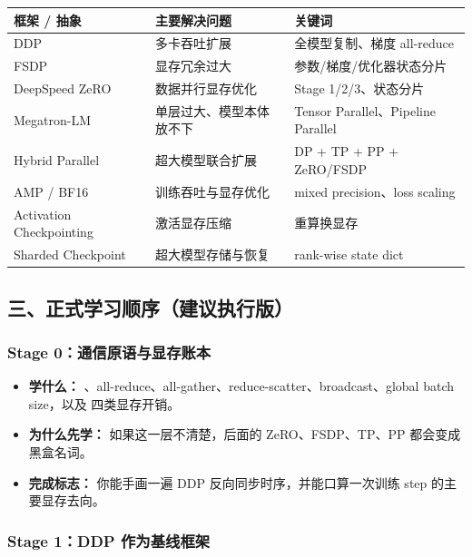 \begin{center}
\begin{tabular}{p{4cm}p{4cm}p{5.5cm}}
\hline
\textbf{框架 / 抽象} & \textbf{主要解决问题} & \textbf{关键词} \\
\hline
DDP & 多卡吞吐扩展 & 全模型复制、梯度 all-reduce \\
FSDP & 显存冗余过大 & 参数/梯度/优化器状态分片 \\
DeepSpeed ZeRO & 数据并行显存优化 & Stage 1/2/3、状态分片 \\
Megatron-LM & 单层过大、模型本体放不下 & Tensor Parallel、Pipeline Parallel \\
Hybrid Parallel & 超大模型联合扩展 & DP + TP + PP + ZeRO/FSDP \\
AMP / BF16 & 训练吞吐与显存优化 & mixed precision、loss scaling \\
Activation Checkpointing & 激活显存压缩 & 重算换显存 \\
Sharded Checkpoint & 超大模型存储与恢复 & rank-wise state dict \\
\hline
\end{tabular}
\end{center}

\subsection{三、正式学习顺序（建议执行版）}

\subsubsection*{Stage 0：通信原语与显存账本}

\begin{itemize}[leftmargin=1.5em]
  \item \textbf{学什么：} 、all-reduce、all-gather、reduce-scatter、broadcast、global batch size，以及  四类显存开销。
  \item \textbf{为什么先学：} 如果这一层不清楚，后面的 ZeRO、FSDP、TP、PP 都会变成黑盒名词。
  \item \textbf{完成标志：} 你能手画一遍 DDP 反向同步时序，并能口算一次训练 step 的主要显存去向。
\end{itemize}


\subsubsection*{Stage 1：DDP 作为基线框架}


